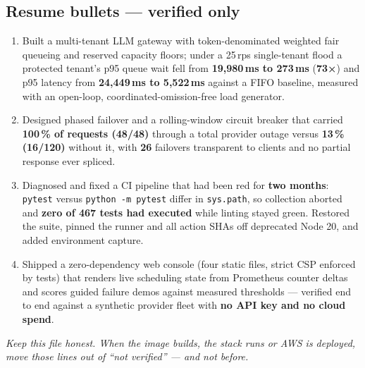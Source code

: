 \documentclass[10pt,a4paper]{article}
\begin{document}
\subsection{Resume bullets — verified only}

\begin{enumerate}[leftmargin=1.4em]
\item Built a multi-tenant LLM gateway with token-denominated weighted fair
  queueing and reserved capacity floors; under a 25\,rps single-tenant flood a
  protected tenant's p95 queue wait fell from \textbf{19{,}980\,ms to 273\,ms}
  (\textbf{73×}) and p95 latency from \textbf{24{,}449\,ms to 5{,}522\,ms}
  against a FIFO baseline, measured with an open-loop, coordinated-omission-free
  load generator.
\item Designed phased failover and a rolling-window circuit breaker that
  carried \textbf{100\,\% of requests (48/48)} through a total provider outage
  versus \textbf{13\,\% (16/120)} without it, with \textbf{26} failovers
  transparent to clients and no partial response ever spliced.
\item Diagnosed and fixed a CI pipeline that had been red for \textbf{two
  months}: \texttt{pytest} versus \texttt{python -m pytest} differ in
  \texttt{sys.path}, so collection aborted and \textbf{zero of 467 tests had
  executed} while linting stayed green. Restored the suite, pinned the runner
  and all action SHAs off deprecated Node 20, and added environment capture.
\item Shipped a zero-dependency web console (four static files, strict CSP
  enforced by tests) that renders live scheduling state from Prometheus
  counter deltas and scores guided failure demos against measured thresholds —
  verified end to end against a synthetic provider fleet with \textbf{no API
  key and no cloud spend}.
\end{enumerate}

\vspace{4pt}
{\footnotesize\itshape Keep this file honest. When the image builds, the stack
runs or AWS is deployed, move those lines out of ``not verified'' — and not
before.}
\end{document}

